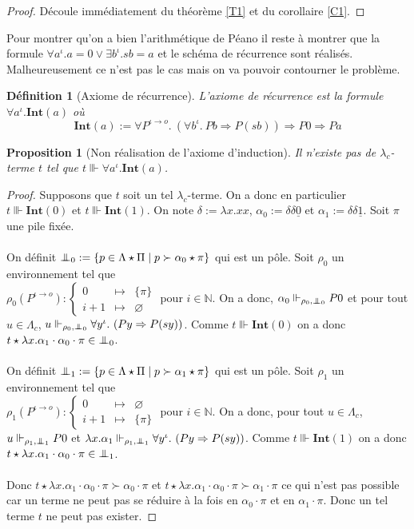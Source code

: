 \documentclass[a4paper,12pt]{article}
\newtheorem{prop}[theo]{Proposition}
\newtheorem{defi}[theo]{Définition}
\theoremstyle{rmqstyle}
\newcommand{\N}{\mathbb{N}}
\newcommand{\set}[1]{\{#1\}}
\newcommand{\fundef}[3]{#1: \left\{\begin{array}{ccc}#2\\#3\end{array}\right.}
\renewcommand{\int}{\mathbf{Int}}
\renewcommand{\implies}{\Rightarrow}
\newcommand{\pole}{{\protect\mathpalette{\protect\polehelper}{\bot}}} \def\polehelper#1#2{\mathrel{\rlap{$#1#2$}\mkern3mu{#1#2}}}
\newcommand{\Kri}[1]{\underline{#1}}
\begin{document}
\begin{proof}
Découle immédiatement du théorème \ref{T1} et du corollaire \ref{C1}.
\end{proof}

Pour montrer qu'on a bien l'arithmétique de Péano il reste à montrer que la formule $\forall a^\iota. a = 0 \lor \exists b^\iota. sb = a$ et le schéma de récurrence sont réalisés. Malheureusement ce n'est pas le cas mais on va pouvoir contourner le problème. 

\begin{defi}[Axiome de récurrence]
L'axiome de récurrence est la formule $\forall a^\iota. \int(a)$ où
$$\int(a) := \forall P^{\iota \to o}. \ (\forall b^\iota. \ Pb \implies P(sb))\implies P0 \implies Pa$$ 
\end{defi}

\begin{prop}[Non réalisation de l'axiome d'induction]
\label{non rec}
Il n'existe pas de $\lambda_c$-terme $t$ tel que $t \Vvdash \forall a^\iota. \int(a)$.
\end{prop}

\begin{proof}
Supposons que $t$ soit un tel $\lambda_c$-terme. On a donc en particulier $t \Vvdash \int(0)$ et $t \Vvdash \int(1)$. On note $\delta := \lambda x. xx$, $\alpha_0 := \delta \delta \Kri{0}$ et $\alpha_1 := \delta \delta \Kri{1}$. Soit $\pi$ une pile fixée. \\
\\
On définit $\pole_0 := \set{ p \in \Lambda \star \Pi \mid p \succ \alpha_0 \star \pi}$ qui est un pôle. Soit $\rho_0$ un environnement tel que\\
$\fundef{\rho_0(P^{\iota \to o})}{0 &\mapsto &\set{\pi}}{i +1 &\mapsto &\varnothing}$ pour $i \in \N$. On a donc, $\alpha_0 \Vdash_{\rho_0, \pole_0} P0$ et pour tout $u \in \Lambda_c$, $u \Vdash_{\rho_0, \pole_0} \forall y^\iota. \ (Py \implies P(sy))$. Comme $t \Vvdash \int(0)$ on a donc $t \star \lambda x. \alpha_1 \cdot \alpha_0 \cdot \pi \in \pole_0$.\\
\\
On définit $\pole_1 := \set{ p \in \Lambda \star \Pi \mid p \succ \alpha_1 \star \pi}$ qui est un pôle. Soit $\rho_1$ un environnement tel que\\
$\fundef{\rho_1(P^{\iota \to o})}{0 &\mapsto &\varnothing}{i +1 &\mapsto &\set{\pi}}$ pour $i \in \N$. On a donc, pour tout $u \in \Lambda_c$, $u \Vdash_{\rho_1, \pole_1} P0$ et $\lambda x. \alpha_1 \Vdash_{\rho_1, \pole_1} \forall y^\iota. \ (Py \implies P(sy))$. Comme $t \Vvdash \int(1)$ on a donc $t \star \lambda x. \alpha_1 \cdot \alpha_0 \cdot \pi \in \pole_1$.\\
\\
Donc $t \star \lambda x. \alpha_1 \cdot \alpha_0 \cdot \pi \succ \alpha_0 \cdot \pi$ et $t \star \lambda x. \alpha_1 \cdot \alpha_0 \cdot \pi \succ \alpha_1 \cdot \pi$ ce qui n'est pas possible car un terme ne peut pas se réduire à la fois en $ \alpha_0 \cdot \pi$ et en $ \alpha_1 \cdot \pi$. Donc un tel terme $t$ ne peut pas exister. 
\end{proof}
\end{document}
